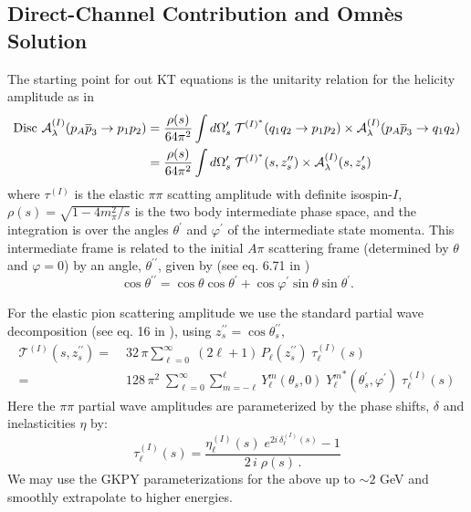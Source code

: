 \subsection{Direct-Channel Contribution and Omn\`{e}s Solution}
The starting point for out KT equations is the unitarity relation for the helicity amplitude as in \cite{Danilkin:2014cra}
  \begin{align}
    \label{eq:unitarity}
    \text{Disc } \mathcal{A}^{(I)}_\lambda(p_A \overline{p}_3 \to p_1 p_2 ) =&\; \frac{\rho(s)}{64 \pi^2} \int d\Omega_s^\prime  \; {\mathcal{T}}^{(I)^*}(q_1q_2 \to p_1p_2) \times \mathcal{A}^{(I)}_\lambda(p_A \overline{p}_{3} \to q_1 q_2 ) \nonumber \\
    =& \; \frac{\rho(s)}{64 \pi^2} \int d\Omega_s^\prime  \; {\mathcal{T}}^{(I)^*}(s,z_s^{\prime\prime}) \times \mathcal{A}^{(I)}_\lambda(s,z_s^{\prime})
  \end{align}
where \({\tau^{(I)}}\) is the elastic \(\pi\pi\) scatting amplitude with definite isospin-\(I\), \(\rho(s) = \sqrt{1 - 4m_\pi^2/s}\) is the two body intermediate phase space, and the integration is over the angles \(\theta^\prime\) and \(\varphi^\prime\) of the intermediate state momenta. This intermediate frame is related to the initial \(A\pi\) scattering frame (determined by \(\theta\) and \(\varphi = 0\)) by an angle, \(\theta^{\prime\prime}\), given by (see eq. 6.71 in \cite{MS})
  \begin{equation}
    \cos \theta^{\prime\prime} = \cos \theta \cos \theta^\prime + \cos \varphi^\prime \sin\theta \sin \theta^\prime.
  \end{equation}

For the elastic pion scattering amplitude we use the standard partial wave decomposition (see eq. 16 in \cite{Danilkin:2014cra}), using \( z_s^{\prime\prime} = \cos \theta_s^{\prime\prime}\),
  \begin{align}
    \label{eq:elastic-pion}
    \mathcal{T}^{(I)}(s, z_s^{\prime\prime}) =& \; 32 \, \pi \sum_{\ell=0  }^\infty \; (2\ell+1) \, P_{\ell}(z_s^{\prime\prime}) \; \tau_\ell^{(I)}(s) \nonumber \\
    =& \; 128 \, \pi^2 \;
    \sum_{\ell=0}^\infty \sum_{m=-\ell}^{\ell}
     Y^m_\ell(\theta_s,0) \; {Y^m_\ell}^*(\theta_s^\prime, \varphi^\prime)
      \; \tau_\ell^{(I)}(s)
  \end{align}
Here the \(\pi\pi\) partial wave amplitudes are parameterized by the phase shifts, \(\delta\) and inelasticities \(\eta\) by:
  \begin{equation}
    \tau^{(I)}_\ell(s) =
    \frac{
    \eta_\ell^{(I)}(s) \; e^{2 i \, \delta_\ell^{(I)}(s)} - 1
    }{
    2 \, i \; \rho(s) \, .
    }
  \end{equation}
We may use the GKPY parameterizations \cite{Garcia-Martin2011} for the above up to \(\sim 2\) GeV and smoothly extrapolate to higher energies.

